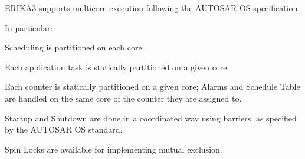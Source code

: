 E\+R\+I\+K\+A3 supports multicore execution following the A\+U\+T\+O\+S\+AR OS specification.

In particular\+:
\begin{DoxyItemize}
\item Scheduling is partitioned on each core.
\item Each application task is statically partitioned on a given core.
\item Each counter is statically partitioned on a given core; Alarms and Schedule Table are handled on the same core of the counter they are assigned to.
\item Startup and Shutdown are done in a coordinated way using barriers, as specified by the A\+U\+T\+O\+S\+AR OS standard.
\item Spin Locks are available for implementing mutual exclusion. 
\end{DoxyItemize}